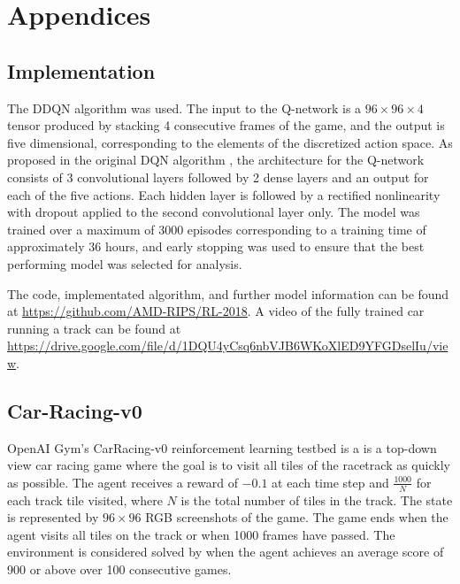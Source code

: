 \documentclass{article}
\begin{document}
\section{Appendices}
\subsection{Implementation}
The DDQN algorithm \cite{DDQN} was used. The input
to the Q-network is a $96\times96\times4$ tensor produced by stacking
4 consecutive frames of the game, and the output is five dimensional,
corresponding to the elements of the discretized action space. As
proposed in the original DQN algorithm \cite{DQN}, the architecture
for the Q-network consists of 3 convolutional layers followed by 2
dense layers and an output for each of the five actions. Each hidden
layer is followed by a rectified nonlinearity with dropout applied to
the second convolutional layer only. The model was trained over a
maximum of 3000 episodes corresponding to a training time of
approximately 36 hours, and early stopping was used to ensure that the
best performing model was selected for analysis.  


The code, implementated algorithm, and further model information can
be found at \url{https://github.com/AMD-RIPS/RL-2018}. A video of the
fully trained car running a track can be found at
\url{https://drive.google.com/file/d/1DQU4yCsq6nbVJB6WKoXlED9YFGDselIu/view}. 

\subsection{Car-Racing-v0}

OpenAI Gym’s CarRacing-v0 reinforcement learning testbed
\cite{CarRacing} is a is a top-down view car racing game where the
goal is to visit all tiles of the racetrack as quickly as
possible. The agent receives a reward of $-0.1$ at each time step and
$\frac{1000}{N}$ for each track tile visited, where $N$ is the total
number of tiles in the track. The state is represented by $96\times96$
RGB screenshots of the game. The game ends when the agent visits all
tiles on the track or when 1000 frames have passed. The environment is
considered solved by when the agent achieves an average score of 900
or above over 100 consecutive games. 
\end{document}
